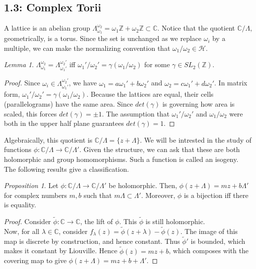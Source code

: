 \documentclass[11pt]{article}
\theoremstyle{plain}
\theoremstyle{definition}
\theoremstyle{example}
\theoremstyle{remark}
\theoremstyle{lemma}
\newtheorem{lemma}{Lemma}[section]
\theoremstyle{proposition}
\newtheorem{proposition}{Proposition}[section]
\theoremstyle{Problem}
\theoremstyle{Solution}
\theoremstyle{theorem}
\theoremstyle{corollary}
\begin{document}
\subsection{1.3: Complex Torii}
A lattice is an abelian group $\Lambda_{\omega_1}^{\omega_2} = \omega_1 \mathbb{Z} + \omega_2 \mathbb{Z} \subset \mathbb{C}$. Notice that the quotient $\mathbb{C}/\Lambda$, geometrically, is a torus. Since the set is unchanged as we replace $\omega_i$ by a multiple, we can make the normalizing convention that $\omega_1/\omega_2 \in \mathcal{H}$.\\
\begin{lemma}
$\Lambda_{\omega_1}^{\omega_2} = \Lambda_{\omega_1'}^{\omega_2'}$ iff $\omega_1'/ \omega_2' = \gamma(\omega_1/\omega_2)$ for some $\gamma\in SL_2(\mathbb{Z})$.
\end{lemma}
\begin{proof}
Since $\omega_i \in \Lambda_{\omega_1'}^{\omega_2'}$, we have $\omega_1 = a\omega_1'+b\omega_2'$ and $\omega_2 = c\omega_1'+d\omega_2'$. In matrix form, $\omega_1'/ \omega_2' = \gamma(\omega_1/\omega_2)$. Because the lattices are equal, their cells (parallelograms) have the same area. Since $det(\gamma)$ is governing how area is scaled, this forces $det(\gamma)=\pm1$. The assumption that $\omega_1'/ \omega_2'$ and $\omega_1/\omega_2$ were both in the upper half plane guarantees $det(\gamma)=1$.
\end{proof}
Algebraically, this quotient is $\mathbb{C}/\Lambda = \{ z + \Lambda\}$. We will be intrested in the study of functions $\phi : \mathbb{C}/\Lambda \to \mathbb{C}/\Lambda'$. Given the structure, we can ask that these are both holomorphic and group homomorphisms. Such a function is called an isogeny. The following results give a classification.
\begin{proposition}
Let $\phi : \mathbb{C}/\Lambda \to \mathbb{C}/\Lambda'$ be holomorphic. Then, $\phi(z+\Lambda) = mz + b \Lambda'$ for complex numbers $m, b$ such that $m\Lambda \subset \Lambda'$. Moreover, $\phi$ is a bijection iff there is equality.
\end{proposition}
\begin{proof}
Consider $\widetilde{\phi}:\mathbb{C} \to \mathbb{C}$, the lift of $\phi$. This $\widetilde{\phi}$ is still holomorphic.\\
Now, for all $\lambda\in\mathbb{C}$, consider $f_\lambda(z) = \widetilde{\phi}(z+\lambda) - \widetilde{\phi}(z)$. The image of this map is discrete by construction, and hence constant. Thus $\widetilde{\phi}'$ is bounded, which makes it constant by Liouville. Hence $\widetilde{\phi}(z) = mz + b$, which composes with the covering map to give $\phi(z + \Lambda) = mz + b + \Lambda'$.
\end{proof}
\end{document}

